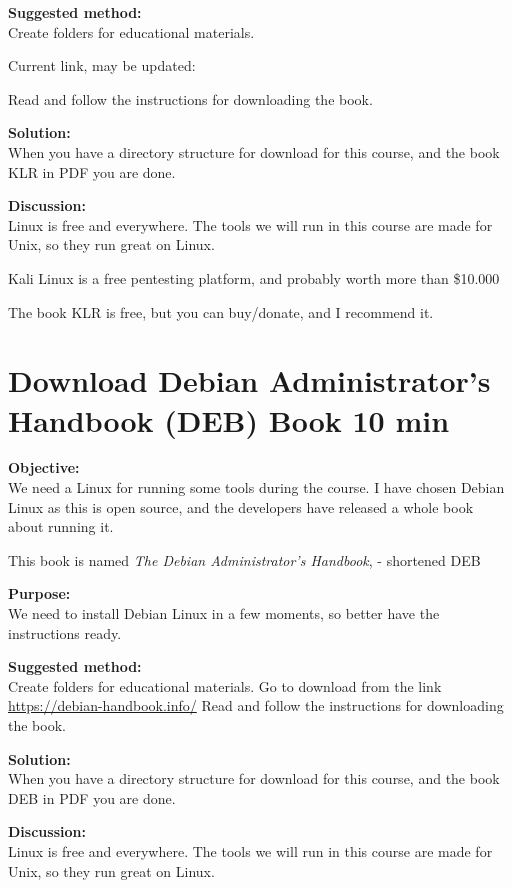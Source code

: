 \documentclass[a4paper,11pt,notitlepage]{report}
\begin{document}
{\bf Suggested method:}\\
Create folders for educational materials.

Current link, may be updated:\\

Read and follow the instructions for downloading the book.

{\bf Solution:}\\
When you have a directory structure for download for this course, and the book KLR in PDF you are done.

{\bf Discussion:}\\
Linux is free and everywhere. The tools we will run in this course are made for Unix, so they run great on Linux.

Kali Linux is a free pentesting platform, and probably worth more than \$10.000

The book KLR is free, but you can buy/donate, and I recommend it.


\chapter{Download Debian Administrator’s Handbook (DEB) Book 10 min}
\label{ex:sw-downloadDEB}



{\bf Objective:}\\
We need a Linux for running some tools during the course. I have chosen Debian Linux as this is open source, and the developers have released a whole book about running it.

This book is named
\emph{The Debian Administrator’s Handbook},  - shortened DEB

{\bf Purpose:}\\
We need to install Debian Linux in a few moments, so better have the instructions ready.

{\bf Suggested method:}\\
Create folders for educational materials. Go to download from the link \url{https://debian-handbook.info/}
Read and follow the instructions for downloading the book.

{\bf Solution:}\\
When you have a directory structure for download for this course, and the book DEB in PDF you are done.

{\bf Discussion:}\\
Linux is free and everywhere. The tools we will run in this course are made for Unix, so they run great on Linux.
\end{document}
